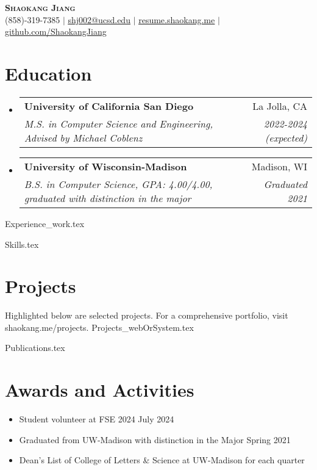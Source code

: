 \documentclass[letterpaper,11pt]{article}
\makeatletter
\newcommand{\resumeItem}[1]{
  \item\small{
    {#1 \vspace{-2pt}}
  }
}
\newcommand{\resumeSubheading}[4]{
  \vspace{-2pt}\item
    \begin{tabular*}{0.97\textwidth}[t]{l@{\extracolsep{\fill}}r}
      \textbf{#1} & #2 \\
      \textit{\small#3} & \textit{\small #4} \\
    \end{tabular*}\vspace{-7pt}
}
\newcommand{\resumeSubHeadingListStart}{\begin{itemize}[leftmargin=0.12in, label={}]}
\newcommand{\resumeSubHeadingListEnd}{\end{itemize}}
\newcommand{\resumeItemListStart}{\begin{itemize}}
\newcommand{\resumeItemListEnd}{\end{itemize}\vspace{-5pt}}
\makeatother
\begin{document}

\begin{center}
    \textbf{\Huge \scshape Shaokang Jiang} \\ \vspace{1pt}
    \small (858)-319-7385 $|$ \href{mailto:shj002@ucsd.edu}{\underline{shj002@ucsd.edu}} $|$ 
    \href{https://resume.shaokang.me}{\underline{resume.shaokang.me}} $|$
    \href{https://github.com/ShaokangJiang}{\underline{github.com/ShaokangJiang}}
\end{center}


\section{Education}
  \resumeSubHeadingListStart
    \resumeSubheading
      {University of California San Diego}{La Jolla, CA}
      {M.S. in Computer Science and Engineering, Advised by Michael Coblenz}{2022-2024 (expected)}
    \resumeSubheading
      {University of Wisconsin-Madison}{Madison, WI}
      {B.S. in Computer Science, GPA: 4.00/4.00, graduated with distinction in the major}{Graduated 2021}
  \resumeSubHeadingListEnd


  
{Experience_work.tex}

%
{Skills.tex}


\section{Projects}

Highlighted below are selected projects. For a comprehensive portfolio, visit shaokang.me/projects.
\vspace{0.5em}
{Projects_webOrSystem.tex}




% 
{Publications.tex}


\section{Awards and Activities}

\resumeItemListStart
\resumeItem{Student volunteer at FSE 2024 \hfill July 2024}
\resumeItem{Graduated from UW-Madison with distinction in the Major \hfill Spring 2021}
\resumeItem{Dean's List of College of Letters \& Science at UW-Madison for each quarter}
\resumeItemListEnd


\end{document}
